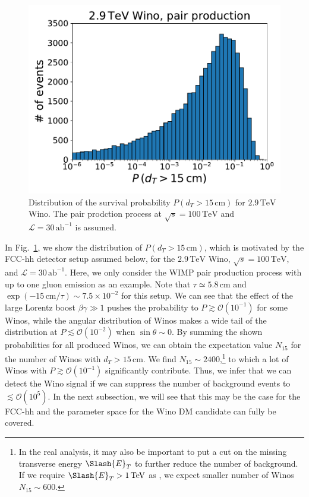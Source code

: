 \documentclass[12pt,twoside,book]{article}
\begin{document}
\begin{figure}[t]
  \centering
  \includegraphics[width=0.5\hsize]{survival_probability.pdf}
  \caption{
    Distribution of the survival probability $P(d_T > 15\,\mathrm{cm})$ for $2.9\,\mathrm{TeV}$ Wino.
    The pair prodction process at $\sqrt{s}=100\,\mathrm{TeV}$ and $\mathcal{L} = 30\,\mathrm{ab}^{-1}$ is assumed.}
  \label{fig:survival_probability}
\end{figure}

In Fig.~\ref{fig:survival_probability}, we show the distribution of $P(d_T > 15\,\mathrm{cm})$, which is motivated by the FCC-hh detector setup assumed below, for the $2.9\,\mathrm{TeV}$ Wino, $\sqrt{s} = 100\,\mathrm{TeV}$, and $\mathcal{L} = 30\,\mathrm{ab}^{-1}$.
Here, we only consider the WIMP pair production process with up to one gluon emission as an example.
Note that $\tau \simeq 5.8\,\mathrm{cm}$ and $\exp (-15\,\mathrm{cm} / \tau) \sim 7.5\times 10^{-2}$ for this setup.
We can see that the effect of the large Lorentz boost $\beta \gamma \gg 1$ pushes the probability to $P \gtrsim \mathcal{O} (10^{-1})$ for some Winos, while the angular distribution of Winos makes a wide tail of the distribution at $P \lesssim \mathcal{O} (10^{-2})$ when $\sin\theta \sim 0$.
By summing the shown probabilities for all produced Winos, we can obtain the expectation value $N_{15}$ for the number of Winos with $d_T > 15\,\mathrm{cm}$.
We find $N_{15} \sim 2400$,\footnote
{
  In the real analysis, it may also be important to put a cut on the missing transverse energy $\Slash{E}_T$ to further reduce the number of background.
  If we require $\Slash{E}_T > 1\,\mathrm{TeV}$ as \cite{Asai:2019wst}, we expect smaller number of Winos $N_{15} \sim 600$.
}
to which a lot of Winos with $P \gtrsim \mathcal{O} (10^{-1})$ significantly contribute.
Thus, we infer that we can detect the Wino signal if we can suppress the number of background events to $\lesssim \mathcal{O}(10^5)$.
In the next subsection, we will see that this may be the case for the FCC-hh and the parameter space for the Wino DM candidate can fully be covered.
\end{document}
